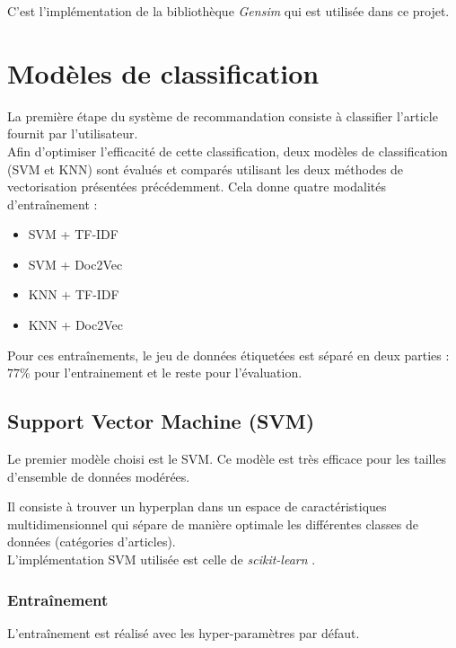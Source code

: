 \documentclass[a4paper,12pt]{article}
\begin{document}
C'est l'implémentation de la bibliothèque \textit{Gensim} \cite{gensim} qui est utilisée dans ce projet.



\section{Modèles de classification}

La première étape du système de recommandation consiste à classifier l'article fournit par l'utilisateur. \\

Afin d'optimiser l'efficacité de cette classification, deux modèles de classification (SVM et KNN) sont évalués et comparés utilisant les deux méthodes de vectorisation présentées précédemment. Cela donne quatre modalités d'entraînement : 
\begin{itemize}
    \item SVM + TF-IDF
    \item SVM + Doc2Vec
    \item KNN + TF-IDF
    \item KNN + Doc2Vec
\end{itemize}

Pour ces entraînements, le jeu de données étiquetées est séparé en deux parties : $77\%$ pour l'entrainement et le reste pour l'évaluation.\\

\subsection{Support Vector Machine (SVM)}

Le premier modèle choisi est le SVM. Ce modèle est très efficace pour les tailles d'ensemble de données modérées.

Il consiste à trouver un hyperplan dans un espace de caractéristiques multidimensionnel qui sépare de manière optimale les différentes classes de données (catégories d'articles).\\

L'implémentation SVM utilisée est celle de \textit{scikit-learn} \cite{svm}.\\



\subsubsection{Entraînement}

L'entraînement est réalisé avec les hyper-paramètres par défaut.\\
\end{document}

